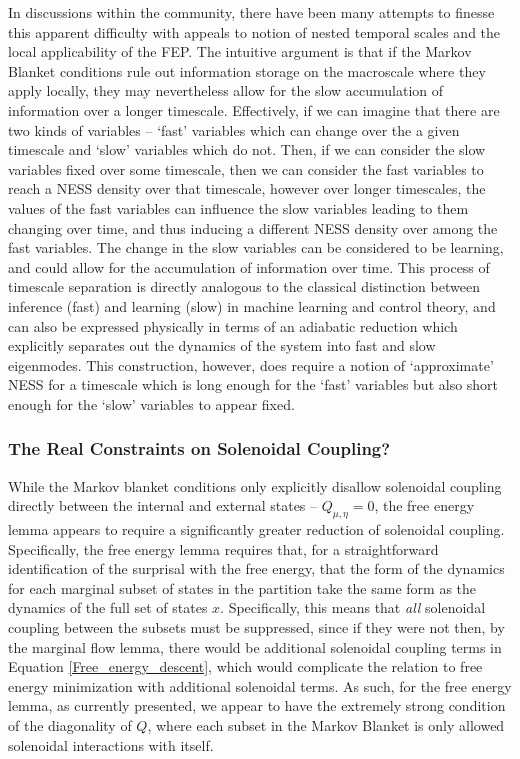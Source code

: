 In discussions within the community, there have been many attempts to finesse this apparent difficulty with appeals to notion of nested temporal scales and the local applicability of the FEP. The intuitive argument is that if the Markov Blanket conditions rule out information storage on the macroscale where they apply locally, they may nevertheless allow for the slow accumulation of information over a longer timescale. Effectively, if we can imagine that there are two kinds of variables -- `fast' variables which can change over the a given timescale and `slow' variables which do not. Then, if we can consider the slow variables fixed over some timescale, then we can consider the fast variables to reach a NESS density over that timescale, however over longer timescales, the values of the fast variables can influence the slow variables leading to them changing over time, and thus inducing a different NESS density over among the fast variables. The change in the slow variables can be considered to be learning, and could allow for the accumulation of information over time. This process of timescale separation is directly analogous to the classical distinction between inference (fast) and learning (slow) in machine learning and control theory, and can also be expressed physically in terms of an adiabatic reduction \citep{friston2019particularphysics} which explicitly separates out the dynamics of the system into fast and slow eigenmodes. This construction, however, does require a notion of `approximate' NESS for a timescale which is long enough for the `fast' variables but also short enough for the `slow' variables to appear fixed.


\subsubsection{The Real Constraints on Solenoidal Coupling?}

While the Markov blanket conditions only explicitly disallow solenoidal coupling directly between the internal and external states -- $Q_{\mu,\eta} = 0$, the free energy lemma appears to require a significantly greater reduction of solenoidal coupling. Specifically, the free energy lemma requires that, for a straightforward identification of the surprisal with the free energy, that the form of the dynamics for each marginal subset of states in the partition take the same form as the dynamics of the full set of states $x$. Specifically, this means that \emph{all} solenoidal coupling between the subsets must be suppressed, since if they were not then, by the marginal flow lemma, there would be additional solenoidal coupling terms in Equation \ref{Free_energy_descent}, which would complicate the relation to free energy minimization with additional solenoidal terms. As such, for the free energy lemma, as currently presented, we appear to have the extremely strong condition of the diagonality of $Q$, where each subset in the Markov Blanket is only allowed solenoidal interactions with itself. 

